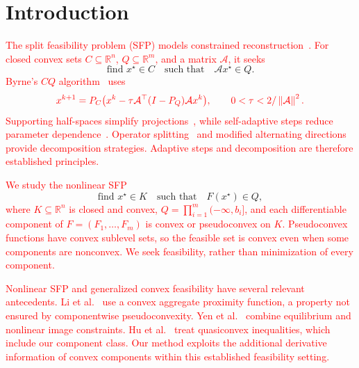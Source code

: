 \documentclass[]{interact}
\theoremstyle{plain}
\theoremstyle{definition}
\theoremstyle{remark}
\newcommand{\R}{\mathbb{R}}
\newcommand{\norm}[1]{\left\lVert #1 \right\rVert}
\begin{document}
\section{Introduction}\label{sec:intro}

\leavevmode\textcolor{red}{The split feasibility problem (SFP) models constrained reconstruction~\citep{censor1994}. For closed convex sets $C\subseteq\R^n$, $Q\subseteq\R^m$, and a matrix $\mathcal A$, it seeks}
\begin{equation}\label{eq:sfp-intro}
\text{find }x^\star\in C\quad\text{such that}\quad\mathcal A x^\star\in Q.
\end{equation}
\leavevmode\textcolor{red}{Byrne's $CQ$ algorithm~\citep{byrne2002} uses}
\begin{equation}\label{eq:cq-intro}\textcolor{red}{
x^{k+1}=P_C\bigl(x^k-\tau\mathcal A^\top(I-P_Q)\mathcal A x^k\bigr),
\qquad 0<\tau<2/\norm{\mathcal A}^2.
}\end{equation}
\leavevmode\textcolor{red}{Supporting half-spaces simplify projections~\citep{yang2004}, while self-adaptive steps reduce parameter dependence~\citep{zhang2009adaptive,zhao2011adaptive,lopez2012}. Operator splitting~\citep{zhang2012simultaneous} and modified alternating directions~\citep{yang2014alternating} provide decomposition strategies. Adaptive steps and decomposition are therefore established principles.}

\leavevmode\textcolor{red}{We study the nonlinear SFP}
\begin{equation}\label{eq:nsfp-intro}
\text{find }x^\star\in K\quad\text{such that}\quad F(x^\star)\in Q,
\end{equation}
\leavevmode\textcolor{red}{where $K\subseteq\R^n$ is closed and convex, $Q=\prod_{i=1}^m(-\infty,b_i]$, and each differentiable component of $F=(F_1,\ldots,F_m)$ is convex or pseudoconvex on $K$. Pseudoconvex functions have convex sublevel sets, so the feasible set is convex even when some components are nonconvex. We seek feasibility, rather than minimization of every component.}

\leavevmode\textcolor{red}{Nonlinear SFP and generalized convex feasibility have several relevant antecedents. Li et al.~\citep{li2013nsfp} use a convex aggregate proximity function, a property not ensured by componentwise pseudoconvexity. Yen et al.~\citep{yen2019} combine equilibrium and nonlinear image constraints. Hu et al.~\citep{hu2022quasi} treat quasiconvex inequalities, which include our component class. Our method exploits the additional derivative information of convex components within this established feasibility setting.}
\end{document}
